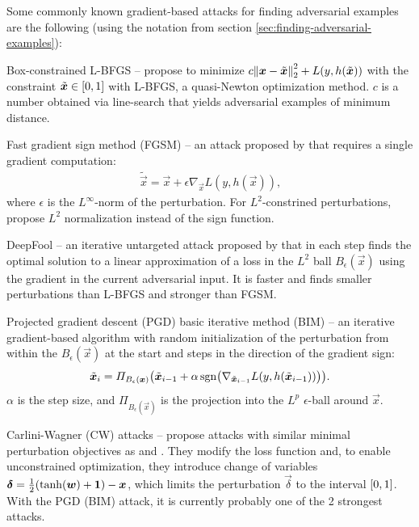 \documentclass[twocolumn]{article}
\begin{document}
Some commonly known gradient-based attacks for finding adversarial examples are the following (using the notation from section \ref{sec:finding-adversarial-examples}):
\begin{soliditemize}
	\item Box-constrained L-BFGS -- \citet{Szegedy:2013:IPNN} propose to minimize $c\enVert{\vec x -\tilde{\vec x}}_2^2+L(y,h(\tilde{\vec x}))$ with the constraint $\tilde{\vec x}\in\intcc{0,1}$ with L-BFGS, a quasi-Newton optimization method. $c$ is a number obtained via line-search that yields adversarial examples of minimum distance.
	\item Fast gradient sign method (FGSM) -- an attack proposed by \citet{Goodfellow:2014:EHAE} that requires a single gradient computation:
	\begin{align}
	\tilde{\vec x} = \vec x + \epsilon\nabla_{\vec x} L(y,h(\vec x)) \text{,}
	\end{align} 
	where $\epsilon$ is the $L^\infty$-norm of the perturbation. For $L^2$-constrined perturbations, \citet{Miyato:2017:VATRMSSSL} propose $L^2$ normalization instead of the sign function.
	\item DeepFool -- an iterative untargeted attack proposed by \cite{Moosavi-Dezfooli:2016:DFSAMFDNN} that in each step finds the optimal solution to a linear approximation of a loss in the $L^2$ ball $B_\epsilon(\vec x)$ using the gradient in the current adversarial input. It is faster and finds smaller perturbations than L-BFGS and stronger than FGSM.
	\item Projected gradient descent (PGD) \citep{Madry:2017:TDLMRAA} basic iterative method (BIM) \citep{Kurakin:2016:AEPW} -- an iterative gradient-based algorithm with random initialization \citep{Madry:2017:TDLMRAA} of the perturbation from within the $B_\epsilon(\vec x)$ at the start and steps in the direction of the gradient sign:
	\begin{equation} \label{eq:pgd}
	\tilde{\vec x}_i = \Pi_{B_\epsilon(\vec x)} \del{\tilde{\vec x}_{i-1} + \alpha\sgn\del{\nabla_{\tilde{\vec x}_{i-1}} L(y,h(\tilde{\vec x}_{i-1}))}} \text{.}
	\end{equation}
	$\alpha$ is the step size, and $\Pi_{B_\epsilon(\vec x)}$ is the projection into the $L^p$ $\epsilon$-ball around $\vec x$.
	\item Carlini-Wagner (CW) attacks -- \citet{Carlini:2017:TERNN} propose attacks with similar minimal perturbation objectives as \cite{Szegedy:2013:IPNN} and \citet{Moosavi-Dezfooli:2016:DFSAMFDNN}. They modify the loss function and, to enable unconstrained optimization, they introduce change of variables $\vec\delta=\frac{1}{2}\del{\tanh\del{\vec w} + \cvec 1} - \vec x$, which limits the perturbation $\vec\delta$ to the interval $\intcc{0,1}$. With the PGD (BIM) attack, it is currently probably one of the 2 strongest attacks.
\end{soliditemize}
\end{document}
